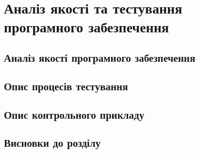 \section{Аналіз якості та тестування програмного забезпечення}

\subsection{Аналіз якості програмного забезпечення}

\subsection{Опис процесів тестування}

\subsection{Опис контрольного прикладу}

\subsection{Висновки до розділу}
